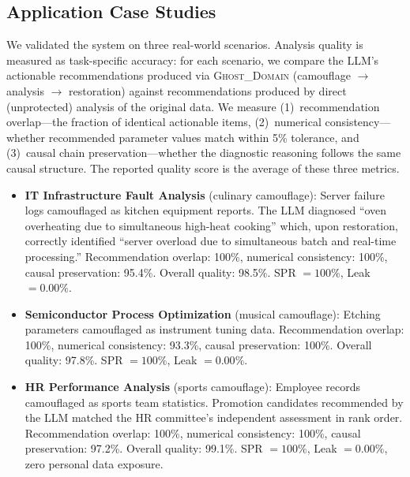 \documentclass[11pt]{article}
\begin{document}
\subsection{Application Case Studies}

We validated the system on three real-world scenarios. Analysis quality is measured as task-specific accuracy: for each scenario, we compare the LLM's actionable recommendations produced via \textsc{Ghost\_Domain} (camouflage $\to$ analysis $\to$ restoration) against recommendations produced by direct (unprotected) analysis of the original data. We measure (1)~recommendation overlap---the fraction of identical actionable items, (2)~numerical consistency---whether recommended parameter values match within 5\% tolerance, and (3)~causal chain preservation---whether the diagnostic reasoning follows the same causal structure. The reported quality score is the average of these three metrics.

\begin{itemize}
\item \textbf{IT Infrastructure Fault Analysis} (culinary camouflage): Server failure logs camouflaged as kitchen equipment reports. The LLM diagnosed ``oven overheating due to simultaneous high-heat cooking'' which, upon restoration, correctly identified ``server overload due to simultaneous batch and real-time processing.'' Recommendation overlap: 100\%, numerical consistency: 100\%, causal preservation: 95.4\%. Overall quality: 98.5\%. SPR $= 100\%$, Leak $= 0.00\%$.

\item \textbf{Semiconductor Process Optimization} (musical camouflage): Etching parameters camouflaged as instrument tuning data. Recommendation overlap: 100\%, numerical consistency: 93.3\%, causal preservation: 100\%. Overall quality: 97.8\%. SPR $= 100\%$, Leak $= 0.00\%$.

\item \textbf{HR Performance Analysis} (sports camouflage): Employee records camouflaged as sports team statistics. Promotion candidates recommended by the LLM matched the HR committee's independent assessment in rank order. Recommendation overlap: 100\%, numerical consistency: 100\%, causal preservation: 97.2\%. Overall quality: 99.1\%. SPR $= 100\%$, Leak $= 0.00\%$, zero personal data exposure.
\end{itemize}

\end{document}

